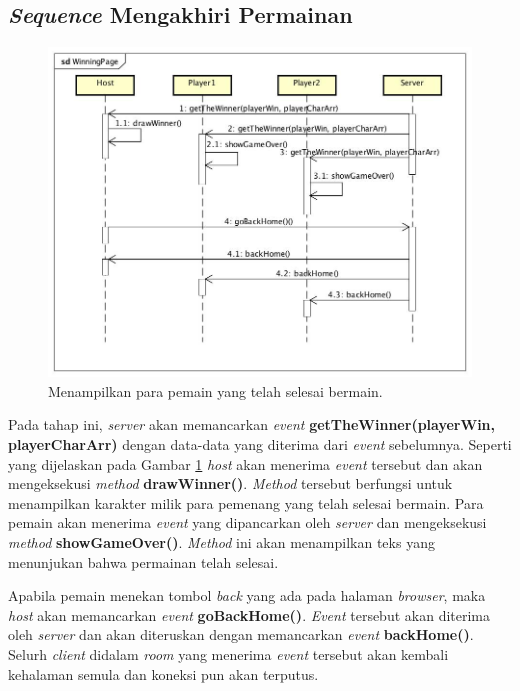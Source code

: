\subsection{\textit{Sequence} Mengakhiri Permainan}
\begin{figure}[H]
	\centering
	\includegraphics[scale=0.33]{Gambar/WinningPage}
	\caption{Menampilkan para pemain yang telah selesai bermain.}
	\label{fig:4_WinningPage}
\end{figure}

Pada tahap ini, \textit{server} akan memancarkan \textit{event} \textbf{getTheWinner(playerWin, playerCharArr)} dengan data-data yang diterima dari \textit{event} sebelumnya. Seperti yang dijelaskan pada Gambar \ref{fig:4_WinningPage} \textit{host} akan menerima \textit{event} tersebut dan akan mengeksekusi \textit{method} \textbf{drawWinner()}. \textit{Method} tersebut berfungsi untuk menampilkan karakter milik para pemenang yang telah selesai bermain. Para pemain akan menerima \textit{event} yang dipancarkan oleh \textit{server} dan mengeksekusi \textit{method} \textbf{showGameOver()}. \textit{Method} ini akan menampilkan teks yang menunjukan bahwa permainan telah selesai.

Apabila pemain menekan tombol \textit{back} yang ada pada halaman \textit{browser}, maka \textit{host} akan memancarkan \textit{event} \textbf{goBackHome()}. \textit{Event} tersebut akan diterima oleh \textit{server} dan akan diteruskan dengan memancarkan \textit{event} \textbf{backHome()}. Selurh \textit{client} didalam \textit{room} yang menerima \textit{event} tersebut akan kembali kehalaman semula dan koneksi pun akan terputus.


